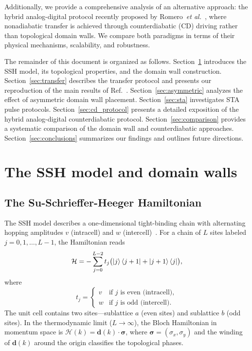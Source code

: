 \documentclass[
  reprint,
  amsmath,
  amssymb,
  aps,
  prb,
  longbibliography,
]{revtex4-2}
\begin{document}
Additionally, we provide a comprehensive analysis of an alternative approach:
the hybrid analog-digital protocol recently proposed by
Romero~\textit{et al.}~\cite{Romero2024}, where nonadiabatic transfer is
achieved through counterdiabatic (CD) driving rather than topological domain
walls. We compare both paradigms in terms of their physical mechanisms,
scalability, and robustness.

The remainder of this document is organized as follows.
Section~\ref{sec:model} introduces the SSH model, its topological properties,
and the domain wall construction. Section~\ref{sec:transfer} describes the
transfer protocol and presents our reproduction of the main results
of Ref.~\cite{Zurita2023}. Section~\ref{sec:asymmetric} analyzes the effect of
asymmetric domain wall placement. Section~\ref{sec:sta} investigates
STA pulse protocols.
Section~\ref{sec:cd_protocol} presents a detailed exposition of the hybrid
analog-digital counterdiabatic protocol. Section~\ref{sec:comparison} provides
a systematic comparison of the domain wall and counterdiabatic approaches.
Section~\ref{sec:conclusions} summarizes our findings and outlines future
directions.

\section{The SSH model and domain walls}
\label{sec:model}

\subsection{The Su-Schrieffer-Heeger Hamiltonian}
\label{sec:ssh}

The SSH model describes a one-dimensional tight-binding chain with alternating
hopping amplitudes $v$ (intracell) and $w$ (intercell)~\cite{SSH1979,SSH1980}.
For a chain of $L$ sites labeled $j = 0, 1, \ldots, L-1$, the Hamiltonian reads
\begin{equation}
  \mathcal{H} = -\sum_{j=0}^{L-2} t_j
  \bigl(\ket{j}\bra{j+1} + \ket{j+1}\bra{j}\bigr),
  \label{eq:ssh_ham}
\end{equation}
where
\begin{equation}
  t_j =
  \begin{cases}
    v & \text{if } j \text{ is even (intracell)}, \\
    w & \text{if } j \text{ is odd (intercell)}.
  \end{cases}
  \label{eq:hoppings}
\end{equation}
The unit cell contains two sites---sublattice $a$ (even sites) and sublattice $b$
(odd sites). In the thermodynamic limit ($L \to \infty$), the Bloch Hamiltonian
in momentum space is $\mathcal{H}(k) = \bm{d}(k) \cdot \bm{\sigma}$, where
$\bm{\sigma} = (\sigma_x, \sigma_y)$ and the winding of $\bm{d}(k)$ around the
origin classifies the topological phases.
\end{document}

